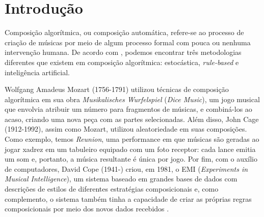 \documentclass{automatextcc}
\begin{document}
\tableofcontents

\listoffigures

\listoftables


\chapter{Introdução}


Composição algorítmica, ou composição automática, refere-se ao processo de criação de músicas por meio de algum processo formal com pouca ou nenhuma intervenção humana. De acordo com \citet{maurer}, podemos encontrar três metodologias diferentes que existem em composição algorítmica: estocástica, \textit{rule-based} e inteligência artificial.

Wolfgang Amadeus Mozart (1756-1791) utilizou técnicas de composição algorítmica em sua obra \textit{Musikalisches Wurfelspiel} (\textit{Dice Music}), um jogo musical que envolvia atribuir um número para fragmentos de músicas, e combiná-los ao acaso, criando uma nova peça com as partes selecionadas. Além disso, John Cage (1912-1992), assim como Mozart, utilizou aleatoriedade em suas composições. Como exemplo, temos \textit{Reunion}, uma performance em que músicas são geradas ao jogar xadrez em um tabuleiro equipado com um foto receptor: cada lance emitia um som e, portanto, a música resultante é única por jogo. Por fim, com o auxílio de computadores, David Cope (1941-) criou, em 1981, o EMI (\textit{Experiments in Musical Intelligence}), um sistema baseado em grandes bases de dados com descrições de estilos de diferentes estratégias composicionais e, como complemento, o sistema também tinha a capacidade de criar as próprias regras composicionais por meio dos novos dados recebidos \citep{alpern1995, maurer}. 



\end{document}
